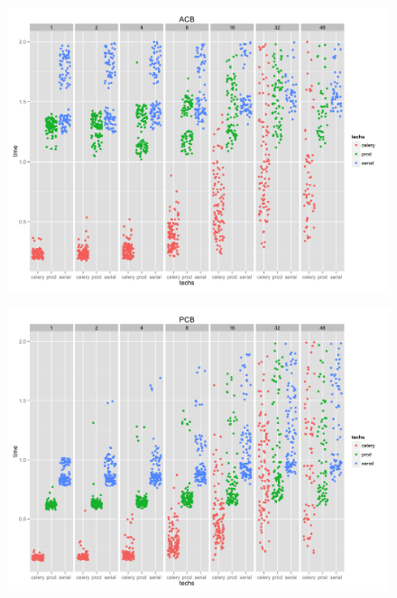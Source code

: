 \documentclass{beamer}
\begin{document}
\begin{frame}
\begin{figure}
\includegraphics[width=\linewidth]{images/ACB.png}
\end{figure}

\end{frame}

\begin{frame}
\begin{figure}
\includegraphics[width=\linewidth]{images/PCB.png}
\end{figure}
\end{frame}
\end{document}
